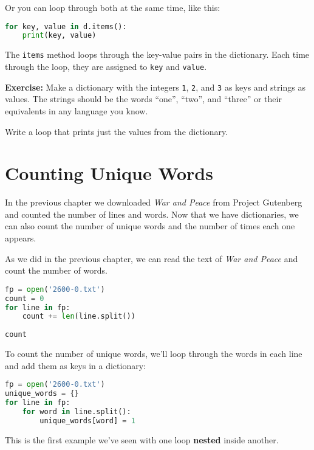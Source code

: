 Or you can loop through both at the same time, like this:

\begin{lstlisting}[language=Python,style=source]
for key, value in d.items():
    print(key, value)
\end{lstlisting}

The \passthrough{\lstinline!items!} method loops through the key-value
pairs in the dictionary. Each time through the loop, they are assigned
to \passthrough{\lstinline!key!} and \passthrough{\lstinline!value!}.

\textbf{Exercise:} Make a dictionary with the integers
\passthrough{\lstinline!1!}, \passthrough{\lstinline!2!}, and
\passthrough{\lstinline!3!} as keys and strings as values. The strings
should be the words ``one'', ``two'', and ``three'' or their equivalents
in any language you know.

Write a loop that prints just the values from the dictionary.

\hypertarget{counting-unique-words}{%
\section{Counting Unique Words}\label{counting-unique-words}}

In the previous chapter we downloaded \emph{War and Peace} from Project
Gutenberg and counted the number of lines and words. Now that we have
dictionaries, we can also count the number of unique words and the
number of times each one appears.

As we did in the previous chapter, we can read the text of \emph{War and
Peace} and count the number of words.

\begin{lstlisting}[language=Python,style=source]
fp = open('2600-0.txt')
count = 0
for line in fp:
    count += len(line.split())
    
count
\end{lstlisting}

To count the number of unique words, we'll loop through the words in
each line and add them as keys in a dictionary:

\begin{lstlisting}[language=Python,style=source]
fp = open('2600-0.txt')
unique_words = {}
for line in fp:
    for word in line.split():
        unique_words[word] = 1
\end{lstlisting}

This is the first example we've seen with one loop \textbf{nested}
inside another.

